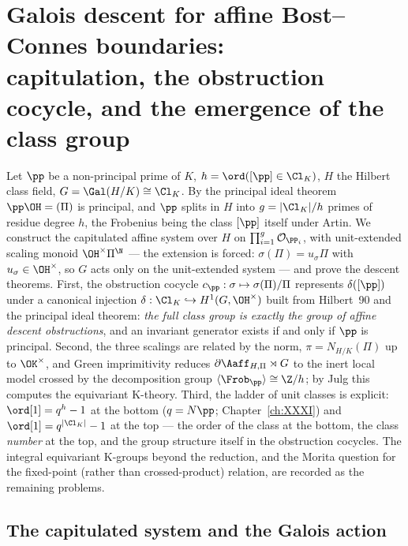 \chapter[Galois descent for affine boundaries]{Galois descent for affine Bost--Connes boundaries:\\ capitulation, the obstruction cocycle, and the emergence of the class group}\label{ch:XXXII}
\renewcommand{\Ns}{N}
\begin{summary}
Let $\pp$ be a non-principal prime of $K$, $h=\ord([\pp]\in\Cl_K)$, $H$ the Hilbert class
field, $G=\Gal(H/K)\cong\Cl_K$. By the principal ideal theorem $\pp\OH=(\Pi)$ is
principal, and $\pp$ splits in $H$ into $g=|\Cl_K|/h$ primes of residue degree $h$, the
Frobenius being the class $[\pp]$ itself under Artin. We construct the capitulated affine
system over $H$ on $\prod_{i=1}^g\mathcal O_{\PP_i}$, with unit-extended scaling monoid
$\OH^\times\Pi^{\N}$ --- the extension is forced: $\sigma(\Pi)=u_\sigma\Pi$ with
$u_\sigma\in\OH^\times$, so $G$ acts only on the unit-extended system --- and prove the
descent theorems. First, the obstruction cocycle $c_\pp:\sigma\mapsto\sigma(\Pi)/\Pi$
represents $\delta([\pp])$ under a canonical injection
$\delta:\Cl_K\hookrightarrow H^1(G,\OH^\times)$ built from Hilbert~90 and the principal
ideal theorem: \emph{the full class group is exactly the group of affine descent
obstructions}, and an invariant generator exists if and only if $\pp$ is principal.
Second, the three scalings are related by the norm, $\pi=N_{H/K}(\Pi)$ up to $\OK^\times$,
and Green imprimitivity reduces $\partial\Aaff_{H,\Pi}\rtimes G$ to the inert local model
crossed by the decomposition group $\langle\Frob_\pp\rangle\cong\Z/h$; by Julg this
computes the equivariant K-theory. Third, the ladder of unit classes is explicit:
$\ord[1]=q^{h}-1$ at the bottom ($q=\Ns\pp$; Chapter~\ref{ch:XXXI}) and
$\ord[1]=q^{|\Cl_K|}-1$ at the top --- the order of the class at the bottom, the class
\emph{number} at the top, and the group structure itself in the obstruction cocycles. The
integral equivariant K-groups beyond the reduction, and the Morita question for the
fixed-point (rather than crossed-product) relation, are recorded as the remaining
problems.
\end{summary}


\section{The capitulated system and the Galois action}\label{XXXII:sec:top}


